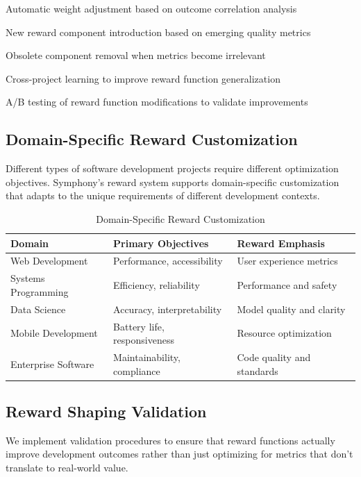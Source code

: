 \begin{compactlist}
    \item Automatic weight adjustment based on outcome correlation analysis
    \item New reward component introduction based on emerging quality metrics
    \item Obsolete component removal when metrics become irrelevant
    \item Cross-project learning to improve reward function generalization
    \item A/B testing of reward function modifications to validate improvements
\end{compactlist}

\subsection*{Domain-Specific Reward Customization}

Different types of software development projects require different optimization objectives. Symphony's reward system supports domain-specific customization that adapts to the unique requirements of different development contexts.

\begin{table}[ht]
\centering
\begin{tabular}{@{}lll@{}}
\toprule
\textbf{Domain} & \textbf{Primary Objectives} & \textbf{Reward Emphasis} \\
\midrule
Web Development & Performance, accessibility & User experience metrics \\
Systems Programming & Efficiency, reliability & Performance and safety \\
Data Science & Accuracy, interpretability & Model quality and clarity \\
Mobile Development & Battery life, responsiveness & Resource optimization \\
Enterprise Software & Maintainability, compliance & Code quality and standards \\
\bottomrule
\end{tabular}
\caption{Domain-Specific Reward Customization}
\end{table}

\subsection*{Reward Shaping Validation}

We implement validation procedures to ensure that reward functions actually improve development outcomes rather than just optimizing for metrics that don't translate to real-world value.

